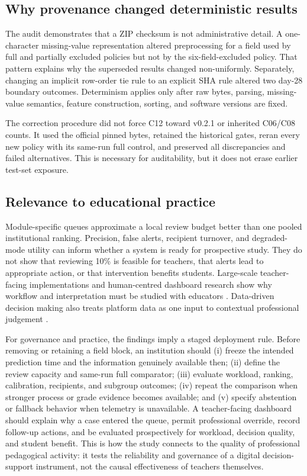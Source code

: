 \documentclass[11pt]{article}
\begin{document}
\subsection{Why provenance changed deterministic results}

The audit demonstrates that a ZIP checksum is not administrative detail. A one-character missing-value representation altered preprocessing for a field used by full and partially excluded policies but not by the six-field-excluded policy. That pattern explains why the superseded results changed non-uniformly. Separately, changing an implicit row-order tie rule to an explicit SHA rule altered two day-28 boundary outcomes. Determinism applies only after raw bytes, parsing, missing-value semantics, feature construction, sorting, and software versions are fixed.

The correction procedure did not force C12 toward v0.2.1 or inherited C06/C08 counts. It used the official pinned bytes, retained the historical gates, reran every new policy with its same-run full control, and preserved all discrepancies and failed alternatives. This is necessary for auditability, but it does not erase earlier test-set exposure.

\subsection{Relevance to educational practice}

Module-specific queues approximate a local review budget better than one pooled institutional ranking. Precision, false alerts, recipient turnover, and degraded-mode utility can inform whether a system is ready for prospective study. They do not show that reviewing 10\% is feasible for teachers, that alerts lead to appropriate action, or that intervention benefits students. Large-scale teacher-facing implementations and human-centred dashboard research show why workflow and interpretation must be studied with educators \citep{herodotou2019teachers,alfredo2024dashboard}. Data-driven decision making also treats platform data as one input to contextual professional judgement \citep{evenstein2026trusting}.

For governance and practice, the findings imply a staged deployment rule. Before removing or retaining a field block, an institution should (i) freeze the intended prediction time and the information genuinely available then; (ii) define the review capacity and same-run full comparator; (iii) evaluate workload, ranking, calibration, recipients, and subgroup outcomes; (iv) repeat the comparison when stronger process or grade evidence becomes available; and (v) specify abstention or fallback behavior when telemetry is unavailable. A teacher-facing dashboard should explain why a case entered the queue, permit professional override, record follow-up actions, and be evaluated prospectively for workload, decision quality, and student benefit. This is how the study connects to the quality of professional pedagogical activity: it tests the reliability and governance of a digital decision-support instrument, not the causal effectiveness of teachers themselves.
\end{document}
